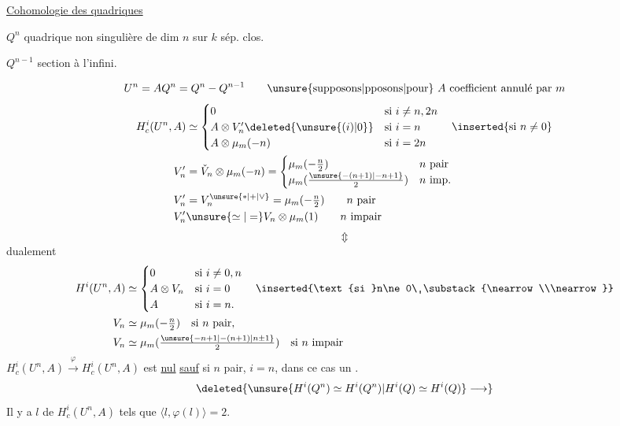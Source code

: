 \uline{Cohomologie des quadriques}

$Q^n$ quadrique non singulière de dim $n$ sur $k$ sép. clos.

$Q^{n-1}$ section à l'infini.

\[
U^n=AQ^n=Q^n-Q^{n-1}
\qquad\text{\unsure{supposons|pposons|pour} $A$ coefficient annulé par $m$}
\]
\[
\begin{aligned}
H_c^i(U^n,A)&\simeq
\begin{cases}
0&\text{si }i\ne n,2n\\
A\otimes V'_n\deleted{\unsure{(i)|0}}&\text{si }i=n\\
A\otimes\mu_m(-n)&\text{si }i=2n
\end{cases}\quad\inserted{\text{si }n\ne0}\\
V'_n&=\check V_n\otimes\mu_m(-n)=\begin{cases}
\mu_m(-\frac n2)&n\text{ pair}\\
\mu_m(\frac{\unsure{-(n+1)|-n+1}}2)&n\text{ imp.}
\end{cases}\\
V'_n&=V_n^{\unsure{*|+|\vee}}=\mu_m(-\tfrac n2)\qquad n\text{ pair}\\
V'_n&\unsure{\simeq|=} V_n\otimes\mu_m(1)\qquad n\text{ impair}
\end{aligned}
\]
\[
\Updownarrow
\]
dualement
\[
\begin{aligned}
H^i(U^n,A)&\simeq\begin{cases}
0 &\text{si }i\ne0,n\\
A\otimes V_n &\text{si }i=0\\
A &\text{si }i=n.
\end{cases}\quad\inserted{\text{si }n\ne0\ \substack{\nearrow\\\nearrow}}\\
V_n&\simeq\mu_m(-\tfrac n2)\quad\text{si $n$ pair,}\\
V_n&\simeq\mu_m(\tfrac{\unsure{-n+1|-(n+1)|n\pm1}}2)\quad\text{si $n$ impair}
\end{aligned}
\]
$H_c^i(U^n,A)\xrightarrow{\varphi}H_c^i(U^n,A)$ est \uline{nul} \uline{sauf} si $n$ pair, $i=n$, dans ce cas  un  .
\[
\deleted{\unsure{H^i(Q^n)\simeq H^i(Q^n)|H^i(Q)\simeq H^i(Q)}\longrightarrow}
\]
Il y a   $l$ de $H_c^i(U^n,A)$ tels que $\langle l,\varphi(l)\rangle=2$.

